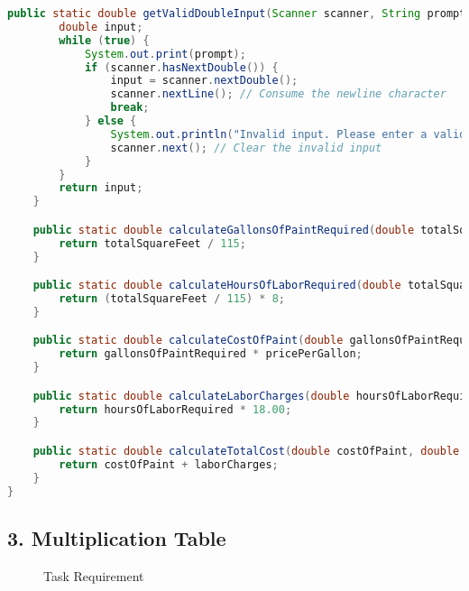 \documentclass{article}
\begin{document}
\begin{lstlisting}[language=Java, caption=Challenge4.java]
    public static double getValidDoubleInput(Scanner scanner, String prompt) {
        double input;
        while (true) {
            System.out.print(prompt);
            if (scanner.hasNextDouble()) {
                input = scanner.nextDouble();
                scanner.nextLine(); // Consume the newline character
                break;
            } else {
                System.out.println("Invalid input. Please enter a valid number.");
                scanner.next(); // Clear the invalid input
            }
        }
        return input;
    }

    public static double calculateGallonsOfPaintRequired(double totalSquareFeet) {
        return totalSquareFeet / 115;
    }

    public static double calculateHoursOfLaborRequired(double totalSquareFeet) {
        return (totalSquareFeet / 115) * 8;
    }

    public static double calculateCostOfPaint(double gallonsOfPaintRequired, double pricePerGallon) {
        return gallonsOfPaintRequired * pricePerGallon;
    }

    public static double calculateLaborCharges(double hoursOfLaborRequired) {
        return hoursOfLaborRequired * 18.00;
    }

    public static double calculateTotalCost(double costOfPaint, double laborCharges) {
        return costOfPaint + laborCharges;
    }
}
\end{lstlisting}

\subsection*{3. Multiplication Table}

\begin{figure}[h]
    \centering
    \caption{Task Requirement}
\end{figure}
\end{document}
